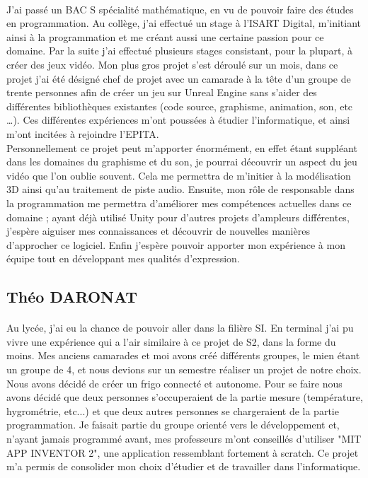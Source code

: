 \documentclass[12pt]{report}
\begin{document}
		\paragraph{}
			J'ai passé un BAC S spécialité mathématique, en vu de pouvoir faire des études en programmation. Au collège, j'ai effectué un stage à l'ISART Digital, m'initiant ainsi à la programmation et me créant aussi une certaine passion pour ce domaine. Par la suite j'ai effectué plusieurs stages consistant, pour la plupart, à créer des jeux vidéo. Mon plus gros projet s'est déroulé sur un mois, dans ce projet j'ai été désigné chef de projet avec un camarade à la tête d'un groupe de trente personnes afin de créer un jeu sur Unreal Engine sans s'aider des différentes bibliothèques existantes (code source, graphisme, animation, son, etc …). Ces différentes expériences m'ont poussées à étudier l'informatique, et ainsi m'ont incitées à rejoindre l'EPITA.\\
			
Personnellement ce projet peut m'apporter énormément, en effet étant suppléant dans les domaines du graphisme et du son, je pourrai découvrir un aspect du jeu vidéo que l'on oublie souvent. Cela me permettra de m'initier à la modélisation 3D ainsi qu'au traitement de piste audio. Ensuite, mon rôle de responsable dans la programmation me permettra d'améliorer mes compétences actuelles dans ce domaine ; ayant déjà utilisé Unity pour d'autres projets d'ampleurs différentes, j'espère aiguiser mes connaissances et découvrir de nouvelles manières d'approcher ce logiciel. Enfin j'espère pouvoir apporter  mon expérience à mon équipe tout en développant mes qualités d'expression.

		\subsection{Théo DARONAT}
		\paragraph{}
		
			Au lycée, j'ai eu la chance de pouvoir aller dans la filière SI. En terminal j'ai pu vivre une expérience qui a l'air similaire à ce projet de S2, dans la forme du moins. Mes anciens camarades et moi avons créé différents groupes, le mien étant un groupe de 4, et nous devions sur un semestre réaliser un projet de notre choix. Nous avons décidé de créer un frigo connecté et autonome. Pour se faire nous avons décidé que deux personnes s'occuperaient de la partie mesure (température, hygrométrie, etc...) et que deux autres personnes se chargeraient de la partie programmation. Je faisait partie du groupe orienté vers le développement et, n'ayant jamais programmé avant, mes professeurs m'ont conseillés d'utiliser "MIT APP INVENTOR 2", une application ressemblant fortement à scratch. Ce projet m'a permis de consolider mon choix d'étudier et de travailler dans l'informatique.\\
			
\end{document}
